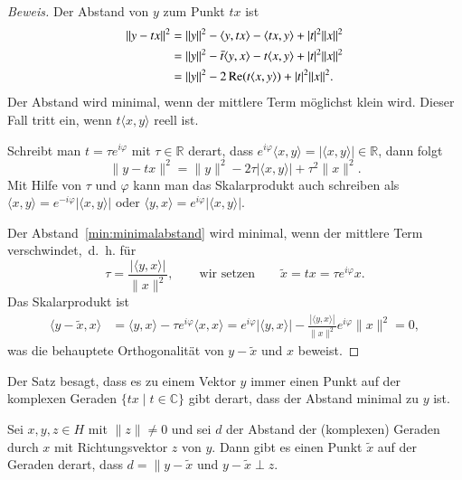 \begin{proof}[Beweis]
Der Abstand von $y$ zum Punkt $tx$ ist
\begin{align*}
\| y-tx \|^2
&=
\|y\|^2
-\langle y,tx\rangle
-\langle tx,y\rangle
+
|t|^2\|x\|^2
\notag
\\
&=
\|y\|^2
-\bar{t} \langle y,x\rangle
-t \langle x,y\rangle
+
|t|^2\|x\|^2
\notag
\\
&=
\|y\|^2
-2\operatorname{Re}(t\langle x,y\rangle)
+
|t|^2\|x\|^2.
\end{align*}
Der Abstand wird minimal, wenn der mittlere Term möglichst klein wird.
Dieser Fall tritt ein, wenn $t\langle x,y\rangle$ reell ist.

Schreibt man $t=\tau e^{i\varphi}$ mit $\tau\in\mathbb R$ derart, dass
$e^{i\varphi}\langle x,y\rangle=|\langle x,y\rangle|\in\mathbb R$,
dann folgt
\begin{equation}
\| y-tx \|^2
=
\|y\|^2
-2\tau|\langle x,y\rangle|
+
\tau^2\|x\|^2.
\label{min:minimalabstand}
\end{equation}
Mit Hilfe von $\tau$ und $\varphi$ kann man das Skalarprodukt auch
schreiben als $\langle x,y\rangle = e^{-i\varphi}|\langle x,y\rangle|$
oder $\langle y,x\rangle = e^{i\varphi}|\langle x,y\rangle|$.

Der Abstand~\ref{min:minimalabstand} wird minimal, wenn der mittlere Term
verschwindet,~d.~h. für
\[
\tau = \frac{|\langle y,x\rangle|}{\|x\|^2},
\qquad
\text{wir setzen}
\qquad
\tilde{x}
=
tx = \tau e^{i\varphi}x.
\]
Das Skalarprodukt ist
\begin{align*}
\langle y-\tilde x,x\rangle
&=
\langle y,x\rangle - \tau e^{i\varphi}\langle x,x\rangle
=
e^{i\varphi}|\langle y,x\rangle|
- \frac{|\langle y,x\rangle|}{\|x\|^2} e^{i\varphi}\|x\|^2
=
0,
\end{align*}
was die behauptete Orthogonalität von $y-\tilde{x}$ und $x$ beweist.
\end{proof}

Der Satz besagt, dass es zu einem Vektor $y$ immer einen Punkt auf der 
komplexen Geraden $\{ tx\;|\; t\in\mathbb C\}$ gibt derart, dass der Abstand
minimal zu $y$ ist.

\begin{satz}
\label{satz:minimalallgemein}
Sei $x,y,z\in H$ mit $\|z\|\ne 0$ und sei $d$ der Abstand der (komplexen)
Geraden durch $x$ mit Richtungsvektor $z$ von $y$.
Dann gibt es einen Punkt $\tilde{x}$ auf der Geraden derart, dass
$d=\|y-\tilde{x}$ und $y-\tilde{x}\perp z$.
\end{satz}

